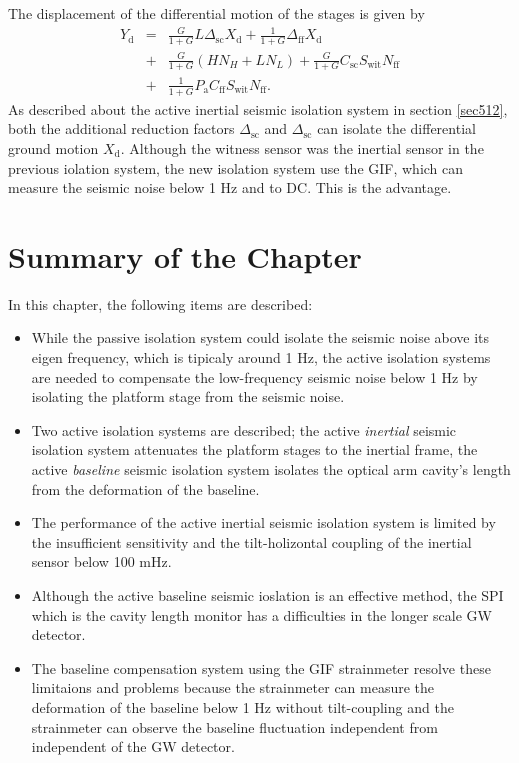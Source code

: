 The displacement of the differential motion of the stages is given by 
\begin{eqnarray}\nonumber
  Y_{\mathrm{d}} &=&\frac{G}{1+G}L\Delta_{\mathrm{sc}} X_{\mathrm{d}} + \frac{1}{1+G} \Delta_{\mathrm{ff}} X_{\mathrm{d}}\\ \nonumber
  &+& \frac{G}{1+G}\left(HN_{H}+LN_{L}\right) + \frac{G}{1+G}C_{\mathrm{sc}}S_{\mathrm{wit}}N_{\mathrm{ff}} \\ 
  &+& \frac{1}{1+G}P_{\mathrm{a}} C_{\mathrm{ff}}S_{\mathrm{wit}}N_{\mathrm{ff}} \label{eq:eq520}.
\end{eqnarray}
As described about the active inertial seismic isolation system in section \ref{sec512}, both the additional reduction factors $\Delta_{\mathrm{sc}}$ and $\Delta_{\mathrm{sc}}$ can isolate the differential ground motion $X_{\mathrm{d}}$. Although the witness sensor was the inertial sensor in the previous iolation system, the new isolation system use the GIF, which can measure the seismic noise below 1 Hz and to DC. This is the advantage.

\section{Summary of the Chapter}
In this chapter, the following items are described:
\begin{itemize}
\item While the passive isolation system could isolate the seismic noise above its eigen frequency, which is tipicaly around 1 Hz, the active isolation systems are needed to compensate the low-frequency seismic noise below 1 Hz by isolating the platform stage from the seismic noise.
\item Two active isolation systems are described; the active {\it inertial} seismic isolation system attenuates the platform stages to the inertial frame, the active {\it baseline} seismic isolation system isolates the optical arm cavity's length from the deformation of the baseline.
\item The performance of the active inertial seismic isolation system is limited by the insufficient sensitivity and the tilt-holizontal coupling of the inertial sensor below 100 mHz.
\item Although the active baseline seismic ioslation is an effective method, the SPI which is the cavity length monitor has a difficulties in the longer scale GW detector.
\item The baseline compensation system using the GIF strainmeter resolve these limitaions and problems because the strainmeter can measure the deformation of the baseline below 1 Hz without tilt-coupling and the strainmeter can observe the baseline fluctuation independent from independent of the GW detector.
\end{itemize}
